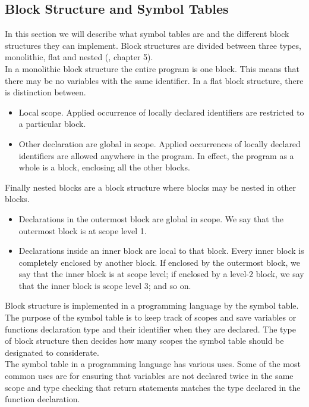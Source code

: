 \subsection{Block Structure and Symbol Tables}\label{Block_Structure_Symbol_Tables}
In this section we will describe what symbol tables are and the different block structures they can implement.
Block structures are divided between three types, monolithic, flat and nested (\cite{compilers-and-intepreters}, chapter 5). \\
In a monolithic block structure the entire program is one block. This means that there may be no variables with the same identifier.
In a flat block structure, there is distinction between.
\begin{itemize}
    \item Local scope. Applied occurrence of locally declared identifiers are restricted to a particular block.
    \item Other declaration are global in scope. Applied occurrences of locally declared identifiers are allowed anywhere in the program. 
    In effect, the program as a whole is a block, enclosing all the other blocks.
\end{itemize}
Finally nested blocks are a block structure where blocks may be nested in other blocks. 
\begin{itemize}
    \item Declarations in the outermost block are global in scope. We say that the outermost block is at scope level 1.
    \item Declarations inside an inner block are local to that block. Every inner block is completely enclosed by another block. If enclosed by the outermost block, we say that the inner block is at scope level; if enclosed by a level-2 block, we say that the inner block is scope level 3; and so on.
\end{itemize}
Block structure is implemented in a programming language by the symbol table. The purpose of the symbol table is to keep track of scopes and save variables or functions declaration type and their identifier when they are declared. The type of block structure then decides how many scopes the symbol table should be designated to considerate.\\
The symbol table in a programming language has various uses. Some of the most common uses are for ensuring that variables are not declared twice in the same scope and type checking that return statements matches the type declared in the function declaration.

